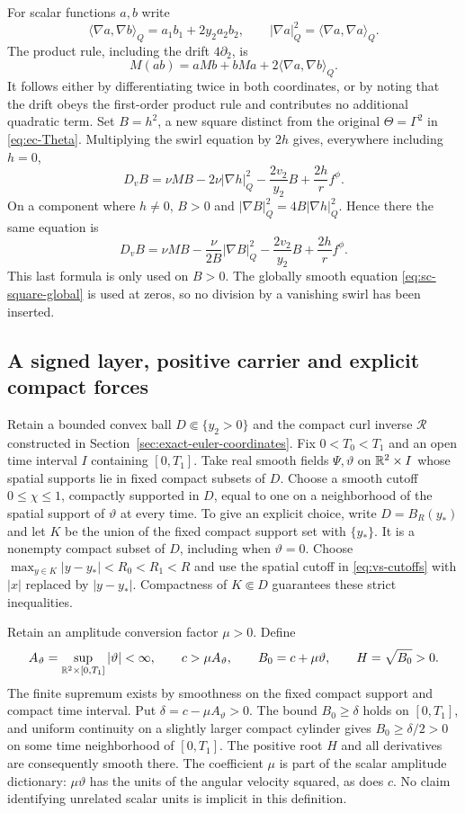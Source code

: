 For scalar functions $a,b$ write
\[
 \langle\nabla a,\nabla b\rangle_Q=a_1b_1+2y_2a_2b_2,
 \qquad |\nabla a|_Q^2=\langle\nabla a,\nabla a\rangle_Q.
\]
The product rule, including the drift $4\partial_2$, is
\[
 M(ab)=aMb+bMa+2\langle\nabla a,\nabla b\rangle_Q.
\]
It follows either by differentiating twice in both coordinates, or by
noting that the drift obeys the first-order product rule and contributes
no additional quadratic term. Set $B=h^2$, a new square distinct from
the original $\Theta=\Gamma^2$ in \eqref{eq:ec-Theta}. Multiplying the
swirl equation by $2h$ gives, everywhere including $h=0$,
\begin{equation}\label{eq:sc-square-global}
 D_v B=\nu MB-2\nu|\nabla h|_Q^2
       -\frac{2v_2}{y_2}B+\frac{2h}{r}f^\phi.
\end{equation}
On a component where $h\ne0$, $B>0$ and
$|\nabla B|_Q^2=4B|\nabla h|_Q^2$. Hence there the same equation is
\begin{equation}\label{eq:sc-square-positive}
 D_v B=\nu MB-\frac{\nu}{2B}|\nabla B|_Q^2
       -\frac{2v_2}{y_2}B+\frac{2h}{r}f^\phi.
\end{equation}
This last formula is only used on $B>0$. The globally smooth equation
\eqref{eq:sc-square-global} is used at zeros, so no division by a
vanishing swirl has been inserted.

\subsection{A signed layer, positive carrier and explicit compact forces}

Retain a bounded convex ball $D\Subset\{y_2>0\}$ and the compact
curl inverse $\mathcal R$ constructed in
Section~\ref{sec:exact-euler-coordinates}. Fix $0<T_0<T_1$ and an
open time interval $I$ containing $[0,T_1]$. Take real smooth fields
$\Psi,\vartheta$ on $\mathbb R^2\times I$ whose spatial supports lie in fixed
compact subsets of $D$. Choose a smooth cutoff
$0\leq\chi\leq1$, compactly supported in $D$, equal to one on a
neighborhood of the spatial support of $\vartheta$ at every time.
To give an explicit choice, write $D=B_R(y_*)$ and let $K$ be the
union of the fixed compact support set with $\{y_*\}$. It is a
nonempty compact subset of $D$, including when $\vartheta=0$. Choose
$\max_{y\in K}|y-y_*|<R_0<R_1<R$ and use the spatial cutoff
in \eqref{eq:vs-cutoffs} with $|x|$ replaced by $|y-y_*|$.
Compactness of $K\Subset D$ guarantees these strict inequalities.

Retain an amplitude conversion factor $\mu>0$. Define
\[
 A_\vartheta=\sup_{\mathbb R^2\times[0,T_1]}|\vartheta|<\infty,
 \qquad c>\mu A_\vartheta,
 \qquad B_0=c+\mu\vartheta,
 \qquad H=\sqrt{B_0}>0.
\]
The finite supremum exists by smoothness on the fixed compact support
and compact time interval. Put $\delta=c-\mu A_\vartheta>0$.
The bound $B_0\geq\delta$ holds on $[0,T_1]$, and uniform continuity
on a slightly larger compact cylinder gives $B_0\geq\delta/2>0$
on some time neighborhood of $[0,T_1]$.
The positive root $H$ and all derivatives are consequently
smooth there. The coefficient $\mu$ is part of the scalar amplitude
dictionary: $\mu\vartheta$ has the units of the angular velocity
squared, as does $c$. No claim identifying unrelated scalar units is
implicit in this definition.

